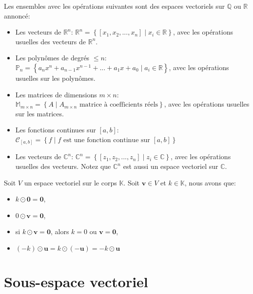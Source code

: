 \documentclass[]{book}
\providecommand{\tightlist}{%
  \setlength{\itemsep}{0pt}\setlength{\parskip}{0pt}}
\theoremstyle{definition}
\theoremstyle{definition}
\theoremstyle{definition}
\theoremstyle{remark}
\let\BeginKnitrBlock\begin \let\EndKnitrBlock\end
\begin{document}
\BeginKnitrBlock{theorem}
\protect\hypertarget{thm:unnamed-chunk-192}{}{\label{thm:unnamed-chunk-192} }Les ensembles avec les opérations suivantes sont des espaces vectoriels sur \(\mathbb{Q}\) ou \(\mathbb{R}\) annoncé:

\begin{itemize}
\tightlist
\item
  Les vecteurs de \(\mathbb{R}^n\): \(\mathbb{R}^n=\left\{[x_1,x_2,...,x_n]\mid x_i\in\mathbb{R}\right\}\), avec les opérations usuelles des vecteurs de \(\mathbb{R}^n\).
\item
  Les polynômes de degrés \(\leq n\): \(\mathbb{P}_n=\left\{a_nx^n+a_{n-1}x^{n-1}+...+a_1x+a_0\mid a_i\in\mathbb{R}\right\}\), avec les opérations usuelles sur les polynômes.
\item
  Les matrices de dimensions \(m\times n\): \(\mathbb{M}_{m\times n}=\left\{A\mid A_{m\times n} \text{ matrice à coefficients réels}\right\}\), avec les opérations usuelles sur les matrices.
\item
  Les fonctions continues sur \([a,b]\): \(\mathscr{C}_{[a,b]}=\left\{f\mid f\text{ est une fonction continue sur $[a,b]$}\right\}\)
\item
  Les vecteurs de \(\mathbb{C}^n\): \(\mathbb{C}^n=\left\{[z_1,z_2,...,z_n]\mid z_i\in\mathbb{C}\right\}\), avec les opérations usuelles des vecteurs. Notez que \(\mathbb{C}^n\) est aussi un espace vectoriel sur \(\mathbb{C}\).
\end{itemize}
\EndKnitrBlock{theorem}

\BeginKnitrBlock{theorem}
\protect\hypertarget{thm:unnamed-chunk-193}{}{\label{thm:unnamed-chunk-193} }Soit \(V\) un espace vectoriel sur le corps \(\mathbb{K}\). Soit \(\mathbf{v}\in V\) et \(k\in\mathbb{K}\), nous avons que:

\begin{itemize}
\tightlist
\item
  \(k\odot\mathbf{0}=\mathbf{0}\),
\item
  \(0\odot\mathbf{v}=\mathbf{0}\),
\item
  si \(k\odot\mathbf{v}=\mathbf{0}\), alors \(k=0\) ou \(\mathbf{v}=\mathbf{0}\),
\item
  \((-k)\odot \mathbf{u}=k\odot (-\mathbf{u})=-k\odot \mathbf{u}\)
\end{itemize}
\EndKnitrBlock{theorem}

\hypertarget{sous-espace-vectoriel}{%
\section{Sous-espace vectoriel}\label{sous-espace-vectoriel}}
\end{document}
